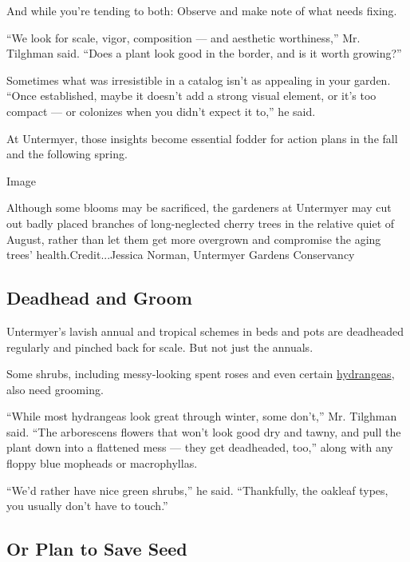 And while you're tending to both: Observe and make note of what needs
fixing.

``We look for scale, vigor, composition --- and aesthetic worthiness,''
Mr. Tilghman said. ``Does a plant look good in the border, and is it
worth growing?''

Sometimes what was irresistible in a catalog isn't as appealing in your
garden. ``Once established, maybe it doesn't add a strong visual
element, or it's too compact --- or colonizes when you didn't expect it
to,'' he said.

At Untermyer, those insights become essential fodder for action plans in
the fall and the following spring.

Image

Although some blooms may be sacrificed, the gardeners at Untermyer may
cut out badly placed branches of long-neglected cherry trees in the
relative quiet of August, rather than let them get more overgrown and
compromise the aging trees' health.Credit...Jessica Norman, Untermyer
Gardens Conservancy

\hypertarget{deadhead-and-groom}{%
\subsection{Deadhead and Groom}\label{deadhead-and-groom}}

Untermyer's lavish annual and tropical schemes in beds and pots are
deadheaded regularly and pinched back for scale. But not just the
annuals.

Some shrubs, including messy-looking spent roses and even certain
\href{https://www.nytimes.com/2020/07/01/realestate/how-to-grow-hydrangea-uncommon-varieties.html/}{hydrangeas},
also need grooming.

``While most hydrangeas look great through winter, some don't,'' Mr.
Tilghman said. ``The arborescens flowers that won't look good dry and
tawny, and pull the plant down into a flattened mess --- they get
deadheaded, too,'' along with any floppy blue mopheads or macrophyllas.

``We'd rather have nice green shrubs,'' he said. ``Thankfully, the
oakleaf types, you usually don't have to touch.''

\hypertarget{or-plan-to-save-seed}{%
\subsection{Or Plan to Save Seed}\label{or-plan-to-save-seed}}

